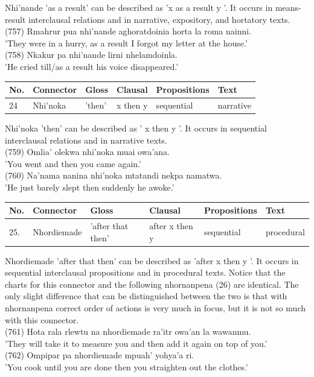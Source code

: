 \documentclass[10pt]{article}
\begin{document}
Nhi'nande 'as a result' can be described as 'x as a result y '. It occurs in means-result interclausal relations and in narrative, expository, and hortatory texts.\\
(757) Rmahrur pua nhi'nande aghoratdoinia horta la roma nainni.\\
'They were in a hurry, as a result I forgot my letter at the house.'\\
(758) Nkakur pa nhi'nande lirni nhelamdoinla.\\
'He cried till/as a result his voice disappeared.'

\begin{center}
\begin{tabular}{|l|l|l|l|l|l|}
\hline
No. & Connector & Gloss & Clausal & Propositions & Text \\
\hline
24 & Nhi'noka & 'then' & x then y & sequential & narrative \\
\hline
\end{tabular}
\end{center}

Nhi'noka 'then' can be described as ' x then y '. It occurs in sequential interclausal relations and in narrative texts.\\
(759) Omlia' olekwa nhi'noka muai owa'ana.\\
'You went and then you came again.'\\
(760) Na'nama nanina nhi'noka mtatandi nekpa namatwa.\\
'He just barely slept then suddenly he awoke.'

\begin{center}
\begin{tabular}{|l|l|l|l|l|l|}
\hline
No. & Connector & Gloss & Clausal & Propositions & Text \\
\hline
25. & Nhordiemade & 'after that then' & after x then y & sequential & procedural \\
\hline
\end{tabular}
\end{center}

Nhordiemade 'after that then' can be described as 'after x then y '. It occurs in sequential interclausal propositions and in procedural texts. Notice that the charts for this connector and the following nhornanpena (26) are identical. The only slight difference that can be distinguished between the two is that with nhornanpena correct order of actions is very much in focus, but it is not so much with this connector.\\
(761) Hota rala rlewtu na nhordiemade ra'itr owa'an la wawanmu.\\
'They will take it to measure you and then add it again on top of you.'\\
(762) Ompipar pa nhordiemade mpuah' yohya'a ri.\\
'You cook until you are done then you straighten out the clothes.'
\end{document}
